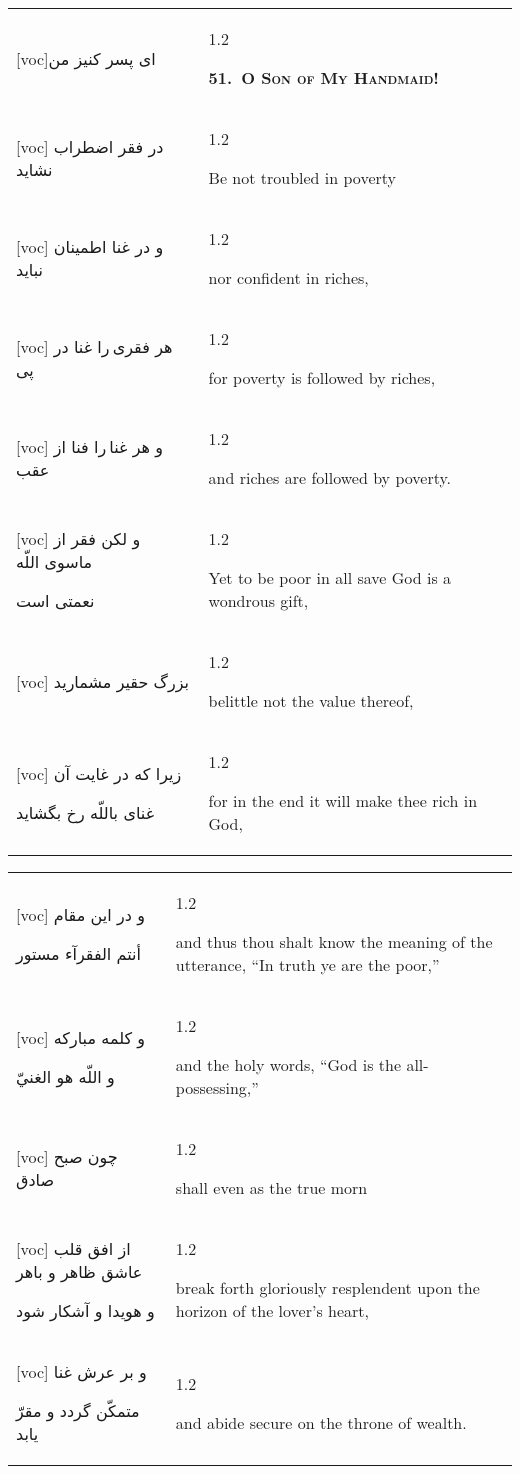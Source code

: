 \documentclass[11pt]{article}
\makeatletter
\newenvironment{orig}
  {\begin{farsi}[voc]}
  {\end{farsi}}
\newenvironment{trans}
  {\Large\begin{spacing}{1.2}\raggedright}
  {\end{spacing}}
\newenvironment{word}
  {\begin{tabular}[t]{p{2.75in}@{\hspace{3em}}p{2.875in}}}
  {\end{tabular}}
\newcommand{\ayat}[2]{\begin{orig}#1\end{orig} & \begin{trans}#2\end{trans}}
\newcommand{\heading}[2]{\textsc{\textbf{#1}} %
}
\makeatother
\begin{document}
\pagebreak

\begin{word}
\ayat{ای پسر کنيز من}{\heading{51.~O Son of My Handmaid!}{}} \\ \ayat{
در فقر اضطراب نشايد
}{Be not troubled in poverty} \vspace{-1ex}\\ \ayat{
و در غنا اطمينان نبايد
}{nor confident in riches,} \vspace{-1ex}\\ \ayat{
هر فقری را غنا در پی
}{for poverty is followed by riches,} \vspace{-1ex}\\ \ayat{
و هر غنا را فنا از عقب
}{and riches are followed by poverty.} \vspace{-1ex}\\ \ayat{
و لکن فقر از ماسوی اللّه

نعمتی است
}{Yet to be poor in all save God is a wondrous gift,} \vspace{-1ex}\\ \ayat{
بزرگ حقير مشماريد
}{belittle not the value thereof,} \vspace{-1ex}\\ \ayat{
زيرا که در غايت آن

غنای باللّه رخ بگشايد
}{for in the end it will make thee rich in God,}
\end{word}

\pagebreak

\begin{word}
\ayat{
و در اين مقام

أنتم الفقرآء مستور
}{and thus thou shalt know the meaning of the utterance, ``In truth ye are the
  poor,''} \vspace{-1ex}\\ \ayat{
و کلمه مبارکه

و اللّه هو الغنيّ
}{and the holy words, ``God is the all-possessing,''} \\ \ayat{
چون صبح صادق
}{shall even as the true morn} \vspace{-1ex}\\ \ayat{
از افق قلب عاشق ظاهر و باهر

و هويدا و آشکار شود
}{break forth gloriously resplendent upon the horizon of the lover's
  heart,} \\ \ayat{
و بر عرش غنا

متمکّن گردد و مقرّ يابد
}{and abide secure on the throne of wealth.}
\end{word}

\pagebreak
\end{document}
